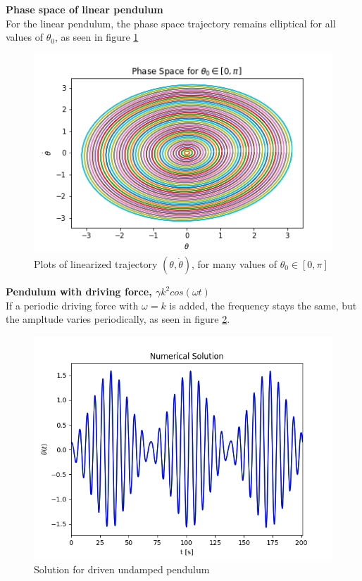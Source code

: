\begin{problem}{2}
	\textbf{Phase space of linear pendulum} \\
	For the linear pendulum, the phase space trajectory remains elliptical for all values of $\theta_{0}$, as seen in figure \ref{phaseLin}

\begin{figure}[h!]
\centering
  \includegraphics[scale=0.6]{../figures/phaseSpaceLinear.png}
  \caption{Plots of linearized trajectory $(\theta,\dot{\theta})$, for many values of $\theta_{0} \in [0,\pi]$}
  \label{phaseLin}
\end{figure}
\end{problem}

\begin{problem}{3}
	\textbf{Pendulum with driving force, $\gamma k^{2}cos(\omega t)$} \\
	If a periodic driving force with $\omega = k$ is added, the frequency stays the same, but the ampltude varies periodically, as seen in figure \ref{driving}. 
\begin{figure}[h!]
	\centering
  	\includegraphics[scale=0.6]{../figures/drivingForce.png}
 	\caption{Solution for driven undamped pendulum}
  	\label{driving}
\end{figure}
\end{problem}

